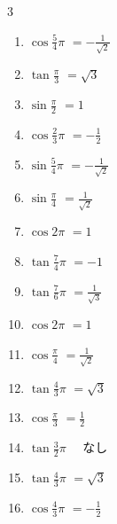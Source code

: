 \begin{multicols}{3}
\begin{enumerate}
  \item $\displaystyle \cos{\frac{5}{4}\pi}$
        $\displaystyle =-\frac{1}{\sqrt{2}}$

  \item $\displaystyle \tan{\frac{\pi}{3}}$
        $\displaystyle =\sqrt{3}$

  \item $\displaystyle \sin{\frac{\pi}{2}}$
        $\displaystyle =1$

  \item $\displaystyle \cos{\frac{2}{3}\pi}$
        $\displaystyle =-\frac{1}{2}$

  \item $\displaystyle \sin{\frac{5}{4}\pi}$
        $\displaystyle =-\frac{1}{\sqrt{2}}$

\columnbreak %

  \item $\displaystyle \sin{\frac{\pi}{4}}$
        $\displaystyle =\frac{1}{\sqrt{2}}$

  \item $\displaystyle \cos{2\pi}$
        $\displaystyle =1$

  \item $\displaystyle \tan{\frac{7}{4}\pi}$
        $\displaystyle =-1$

  \item $\displaystyle \tan{\frac{7}{6}\pi}$
        $\displaystyle =\frac{1}{\sqrt{3}}$

  \item $\displaystyle \cos{2\pi}$
        $\displaystyle =1$

  \item $\displaystyle \cos{\frac{\pi}{4}}$
        $\displaystyle =\frac{1}{\sqrt{2}}$

  \item $\displaystyle \tan{\frac{4}{3}\pi}$
        $\displaystyle =\sqrt{3}$

  \item $\displaystyle \cos{\frac{\pi}{3}}$
        $\displaystyle =\frac{1}{2}$

  \item $\displaystyle \tan{\frac{3}{2}\pi}$
        $\displaystyle \quad なし$

  \item $\displaystyle \tan{\frac{4}{3}\pi}$
        $\displaystyle =\sqrt{3}$

  \item $\displaystyle \cos{\frac{4}{3}\pi}$
        $\displaystyle =-\frac{1}{2}$


\end{enumerate}
\end{multicols}
